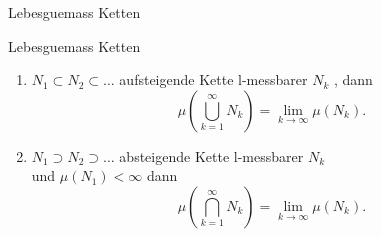 \documentclass[class=article, crop=false]{standalone}
\begin{document}
\begin{zettel}{Lebesguemass Ketten}
\begin{flashcard}[djlyjqa5]{Lebesguemass Ketten}
	\begin{enumerate}
		\item $ N_1 \subset N_2 \subset \dots$ aufsteigende Kette l-messbarer $N_k$ , dann
		      \[
			      \mu (\bigcup_{k = 1 }^\infty N_k) = \lim_{k \to \infty} \mu(N_k)
		      .\]
		\item $ N_1 \supset N_2 \supset \dots $ absteigende Kette l-messbarer $N_k$\\
		      und $\mu(N_1) < \infty$ dann
		      \[
			      \mu ( \bigcap_{k = 1 }^{\infty} N_k) = \lim_{k \to \infty} \mu(N_k)
		      .\]
	\end{enumerate}
\end{flashcard}
\end{zettel}
\end{document}
